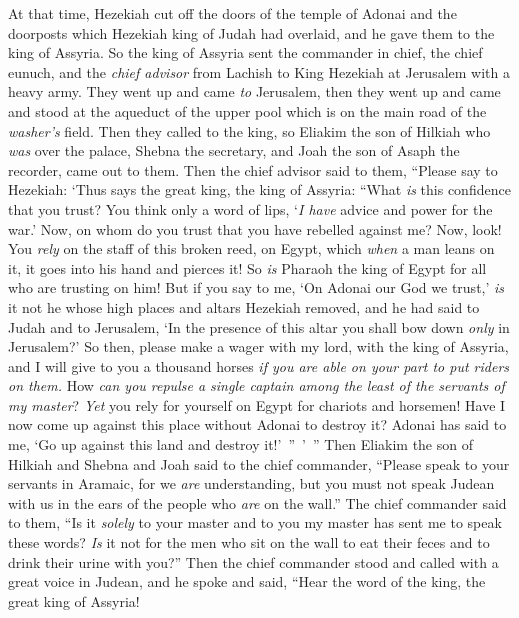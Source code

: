 \begin{biblechapter}
\verse At that time, Hezekiah cut off the doors of the temple of Adonai and the doorposts which Hezekiah king of Judah had overlaid, and he gave them to the king of Assyria.
\verse So the king of Assyria sent the commander in chief, the chief eunuch, and the \textit{chief advisor} from Lachish to King Hezekiah at Jerusalem with a heavy army. They went up and came \textit{to} Jerusalem, then they went up and came and stood at the aqueduct of the upper pool which is on the main road of the \textit{washer’s} field.
\verse Then they called to the king, so Eliakim the son of Hilkiah who \textit{was} over the palace, Shebna the secretary, and Joah the son of Asaph the recorder, came out to them.
 Then the chief advisor said to them, “Please say to Hezekiah: ‘Thus says the great king, the king of Assyria: “What \textit{is} this confidence that you trust?
\verse You think only a word of lips, ‘\textit{I have} advice and power for the war.’ Now, on whom do you trust that you have rebelled against me?
\verse Now, look! You \textit{rely} on the staff of this broken reed, on Egypt, which \textit{when} a man leans on it, it goes into his hand and pierces it! So \textit{is} Pharaoh the king of Egypt for all who are trusting on him!
\verse But if you say to me, ‘On Adonai our God we trust,’ \textit{is} it not he whose high places and altars Hezekiah removed, and he had said to Judah and to Jerusalem, ‘In the presence of this altar you shall bow down \textit{only} in Jerusalem?’
\verse So then, please make a wager with my lord, with the king of Assyria, and I will give to you a thousand horses \textit{if you are able on your part to put riders on them.}
\verse How \textit{can you repulse a single captain among the least of the servants of my master}? \textit{Yet} you rely for yourself on Egypt for chariots and horsemen!
\verse Have I now come up against this place without Adonai to destroy it? Adonai has said to me, ‘Go up against this land and destroy it!’ ” ’ ”
\verse Then Eliakim the son of Hilkiah and Shebna and Joah said to the chief commander, “Please speak to your servants in Aramaic, for we \textit{are} understanding, but you must not speak Judean with us in the ears of the people who \textit{are} on the wall.”
\verse The chief commander said to them, “Is it \textit{solely} to your master and to you my master has sent me to speak these words? \textit{Is} it not for the men who sit on the wall to eat their feces and to drink their urine with you?”
\verse Then the chief commander stood and called with a great voice in Judean, and he spoke and said, “Hear the word of the king, the great king of Assyria!

\end{biblechapter}
